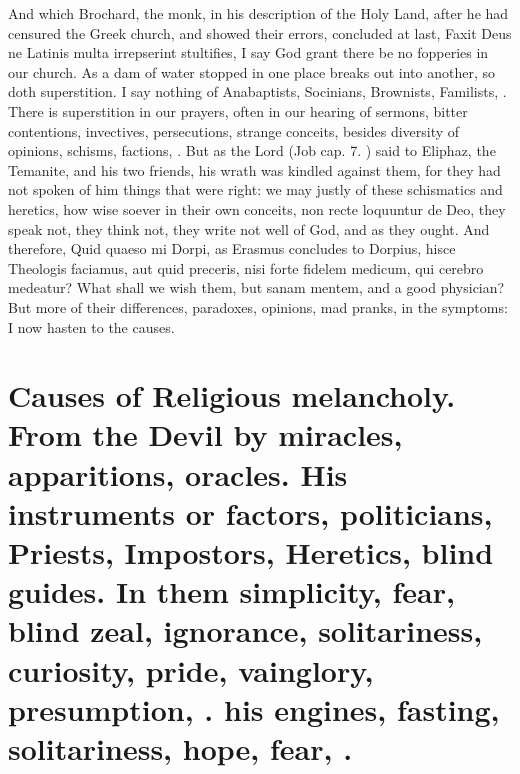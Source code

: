 {And which Brochard, the monk, in his description of the Holy
Land, after he had censured the Greek church, and showed their errors,
concluded at last, Faxit Deus ne Latinis multa irrepserint stultifies,
I say God grant there be no fopperies in our church. As a dam of water
stopped in one place breaks out into another, so doth superstition. I
say nothing of Anabaptists, Socinians, Brownists, Familists, \etc{}. There
is superstition in our prayers, often in our hearing of sermons, bitter
contentions, invectives, persecutions, strange conceits, besides
diversity of opinions, schisms, factions, \etc{}. But as the Lord (Job
 cap. 7. ) said to Eliphaz, the Temanite, and his two friends,
his wrath was kindled against them, for they had not spoken of him
things that were right: we may justly of these schismatics and
heretics, how wise soever in their own conceits, non recte loquuntur de
Deo, they speak not, they think not, they write not well of God, and as
they ought. And therefore, Quid quaeso mi Dorpi, as Erasmus concludes
to Dorpius, hisce Theologis faciamus, aut quid preceris, nisi forte
fidelem medicum, qui cerebro medeatur? What shall we wish them, but
sanam mentem, and a good physician? But more of their differences,
paradoxes, opinions, mad pranks, in the symptoms: I now hasten to the
causes.

\section[Causes of Religious melancholy]{Causes of Religious melancholy. From the Devil by miracles, apparitions, oracles. His instruments or factors, politicians, Priests, Impostors, Heretics, blind guides. In them simplicity, fear, blind zeal, ignorance, solitariness, curiosity, pride, vainglory, presumption, \etc{}. his engines, fasting, solitariness, hope, fear, \etc{}.}

}

